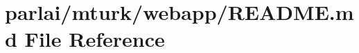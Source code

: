 \hypertarget{parlai_2mturk_2webapp_2README_8md}{}\section{parlai/mturk/webapp/\+R\+E\+A\+D\+ME.md File Reference}
\label{parlai_2mturk_2webapp_2README_8md}
